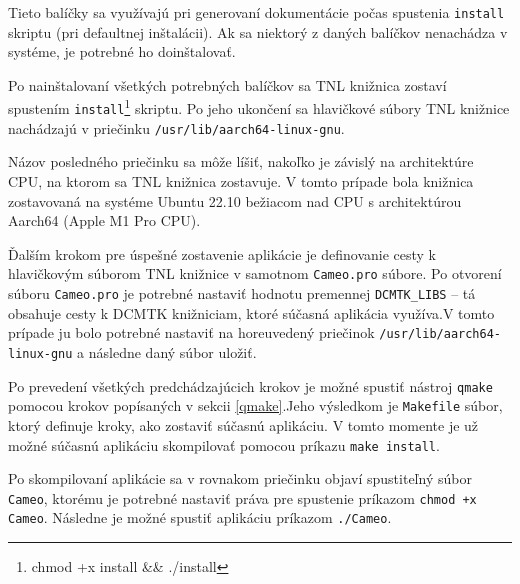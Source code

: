 {Tieto balíčky sa využívajú pri generovaní dokumentácie počas spustenia \texttt{install} skriptu (pri defaultnej inštalácii). Ak sa niektorý z daných balíčkov nenachádza v systéme, je potrebné ho doinštalovať.

Po nainštalovaní všetkých potrebných balíčkov sa TNL knižnica zostaví spustením \texttt{install}\footnote{chmod +x install \&\& ./install} skriptu. Po jeho ukončení sa hlavičkové súbory TNL knižnice nachádzajú v priečinku \texttt{/usr/lib/aarch64-linux-gnu}.

\clearpage
Názov posledného priečinku sa môže líšiť, nakoľko je závislý na architektúre CPU, na ktorom sa TNL knižnica zostavuje. V tomto prípade bola knižnica zostavovaná na systéme Ubuntu 22.10 bežiacom nad CPU s architektúrou Aarch64 (Apple M1 Pro CPU).

Ďalším krokom pre úspešné zostavenie aplikácie je definovanie cesty k hlavičkovým súborom TNL knižnice v samotnom \texttt{Cameo.pro} súbore. Po otvorení súboru \texttt{Cameo.pro} je potrebné nastaviť hodnotu premennej \lstinline{DCMTK_LIBS} -- tá obsahuje cesty k DCMTK knižniciam, ktoré súčasná aplikácia využíva.\newline V tomto prípade ju bolo potrebné nastaviť na horeuvedený priečinok \newline \texttt{/usr/lib/aarch64-linux-gnu} a následne daný súbor uložiť.

Po prevedení všetkých predchádzajúcich krokov je možné spustiť nástroj \texttt{qmake} pomocou krokov popísaných v sekcii \ref{qmake}.\newline Jeho výsledkom je \texttt{Makefile} súbor, ktorý definuje kroky, ako zostaviť súčasnú aplikáciu. V tomto momente je už možné súčasnú aplikáciu skompilovať pomocou príkazu \texttt{make install}.

Po skompilovaní aplikácie sa v rovnakom priečinku objaví spustiteľný súbor \texttt{Cameo}, ktorému je potrebné nastaviť práva pre spustenie príkazom \texttt{chmod +x Cameo}. Následne je možné spustiť aplikáciu príkazom \texttt{./Cameo}. \clearpage

}
